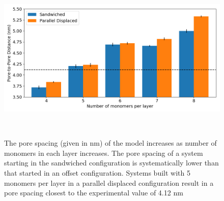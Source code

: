 \documentclass{article}
\begin{document}
  \begin{figure}
	\centering
	\includegraphics[width=\linewidth]{p2p.png}
	\caption{The pore spacing (given in nm) of the model increases as
	number of monomers in each layer increases. The pore spacing of a system
	starting in the sandwiched configuration is systematically lower than 
	that started in an offset configuration. Systems built with 5 monomers
	per layer in a parallel displaced configuration result in a pore spacing
	closest to the experimental value of 4.12 nm}~\label{fig:p2p}
  \end{figure}  
\end{document}
